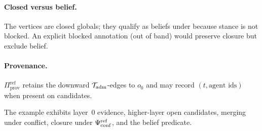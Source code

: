 \paragraph{Closed versus belief.}
The vertices are closed globals; they qualify as beliefs under  because stance is not $\mathrm{blocked}$.
An explicit $\mathrm{blocked}$ annotation (out of band) would preserve closure but exclude belief.

\paragraph{Provenance.}
$\Pi_{\mathrm{prov}}^{\mathrm{ref}}$ retains the downward $\mathcal{T}_{\mathrm{adm}}$-edges to $o_0$ and may record $(t,\text{agent ids})$ when present on candidates.

The example exhibits layer~$0$ evidence, higher-layer open candidates, merging under conflict, closure under $\Psi_{\mathrm{conf}}^{\mathrm{ref}}$, and the belief predicate.
